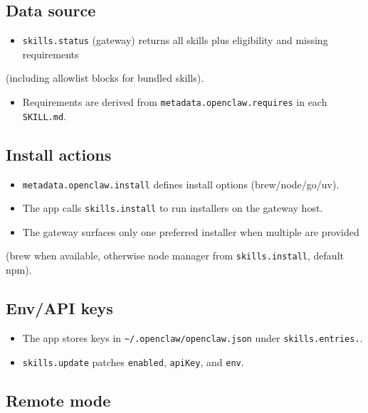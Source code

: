 \subsection{Data source}


\begin{itemize}
  \item \texttt{skills.status} (gateway) returns all skills plus eligibility and missing requirements
\end{itemize}

(including allowlist blocks for bundled skills).
\begin{itemize}
  \item Requirements are derived from \texttt{metadata.openclaw.requires} in each \texttt{SKILL.md}.
\end{itemize}


\subsection{Install actions}


\begin{itemize}
  \item \texttt{metadata.openclaw.install} defines install options (brew/node/go/uv).
  \item The app calls \texttt{skills.install} to run installers on the gateway host.
  \item The gateway surfaces only one preferred installer when multiple are provided
\end{itemize}

(brew when available, otherwise node manager from \texttt{skills.install}, default npm).

\subsection{Env/API keys}


\begin{itemize}
  \item The app stores keys in \texttt{\textasciitilde{}/.openclaw/openclaw.json} under \texttt{skills.entries.}.
  \item \texttt{skills.update} patches \texttt{enabled}, \texttt{apiKey}, and \texttt{env}.
\end{itemize}


\subsection{Remote mode}


